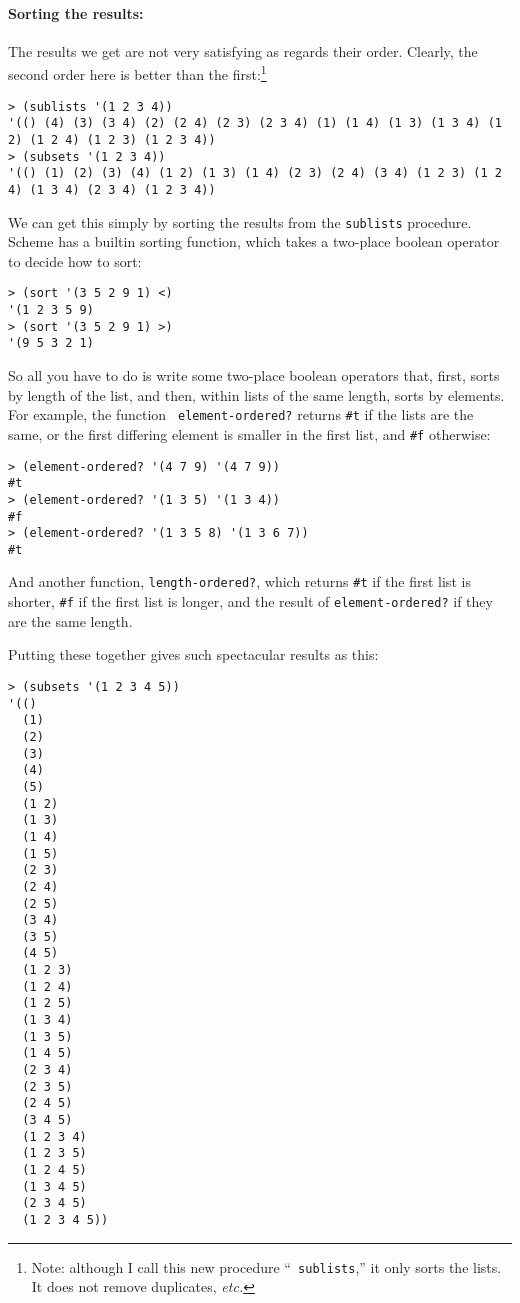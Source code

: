 \documentclass{article}
\begin{document}
\paragraph{Sorting the results:}
The results we get are not very satisfying as regards their order.
Clearly, the second order here is better than the
first:\footnote{Note: although I call this new procedure ``{\tt
    sublists},'' it only sorts the lists.  It does not remove
  duplicates, {\em etc.}}
{\small
  \begin{Verbatim}[frame=single]
> (sublists '(1 2 3 4))
'(() (4) (3) (3 4) (2) (2 4) (2 3) (2 3 4) (1) (1 4) (1 3) (1 3 4) (1 2) (1 2 4) (1 2 3) (1 2 3 4))
> (subsets '(1 2 3 4))
'(() (1) (2) (3) (4) (1 2) (1 3) (1 4) (2 3) (2 4) (3 4) (1 2 3) (1 2 4) (1 3 4) (2 3 4) (1 2 3 4))
\end{Verbatim}
}
We can get this simply by sorting the results from the {\tt sublists}
procedure.  Scheme has a builtin sorting function, which takes a
two-place boolean operator to decide how to sort:
\begin{Verbatim}[frame=single]
> (sort '(3 5 2 9 1) <)
'(1 2 3 5 9)
> (sort '(3 5 2 9 1) >)
'(9 5 3 2 1)
\end{Verbatim}
So all you have to do is write some two-place boolean operators that,
first, sorts by length of the list, and then, within lists of the same
length, sorts by elements.  For example, the function {\tt
  element-ordered?} returns \verb|#t| if the lists are the same, or
the first differing element is smaller in the first list, and
\verb|#f| otherwise:
\begin{Verbatim}[frame=single]
> (element-ordered? '(4 7 9) '(4 7 9))
#t
> (element-ordered? '(1 3 5) '(1 3 4))
#f
> (element-ordered? '(1 3 5 8) '(1 3 6 7))
#t
\end{Verbatim}
And another function, {\tt length-ordered?}, which returns \verb|#t|
if the first list is shorter, \verb|#f| if the first list is
longer, and the result of {\tt element-ordered?} if they are the same
length. 

\newpage
Putting these together gives such spectacular results as this:
{
  \begin{Verbatim}[frame=single]
> (subsets '(1 2 3 4 5))
'(()
  (1)
  (2)
  (3)
  (4)
  (5)
  (1 2)
  (1 3)
  (1 4)
  (1 5)
  (2 3)
  (2 4)
  (2 5)
  (3 4)
  (3 5)
  (4 5)
  (1 2 3)
  (1 2 4)
  (1 2 5)
  (1 3 4)
  (1 3 5)
  (1 4 5)
  (2 3 4)
  (2 3 5)
  (2 4 5)
  (3 4 5)
  (1 2 3 4)
  (1 2 3 5)
  (1 2 4 5)
  (1 3 4 5)
  (2 3 4 5)
  (1 2 3 4 5))
\end{Verbatim}
}
\end{document}
